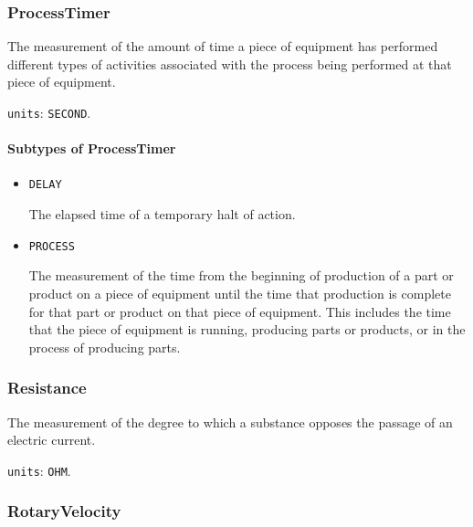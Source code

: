 \subsubsection{ProcessTimer}
\label{sec:ProcessTimer}



The measurement of the amount of time a piece of equipment has performed different types of activities associated with the process being performed at that piece of equipment.


\texttt{units}: \texttt{SECOND}.

\paragraph{Subtypes of ProcessTimer}\mbox{}
\label{sec:Subtypes of ProcessTimer}

\begin{itemize}

\item \texttt{DELAY}


The elapsed time of a temporary halt of action.

\item \texttt{PROCESS}


The measurement of the time from the beginning of production of a part or product on a piece of equipment until the time that production is complete for that part or product on that piece of equipment.  This includes the time that the piece of equipment is running, producing parts or products, or in the process of producing parts.


\end{itemize}





\subsubsection{Resistance}
\label{sec:Resistance}



The measurement of the degree to which a substance opposes the passage of an electric current.


\texttt{units}: \texttt{OHM}.


\subsubsection{RotaryVelocity}
\label{sec:RotaryVelocity}



